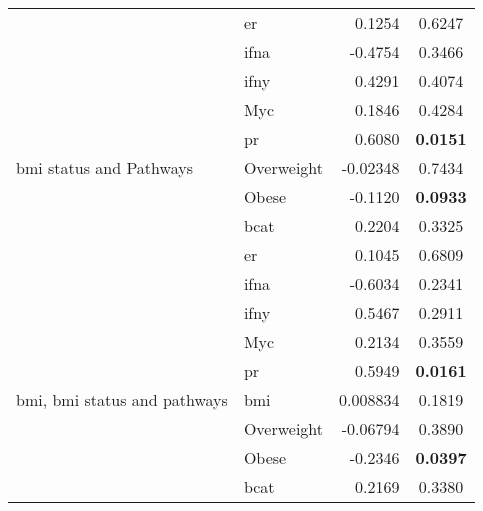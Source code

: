 \begin{table}[htpb]
\begin{threeparttable}
\begin{tabular}{llrc}
                                                                           & \gls{er}   & 0.1254    & 0.6247 \\
                                                                           & \gls{ifna} & -0.4754   & 0.3466 \\
                                                                           & \gls{ifny} & 0.4291    & 0.4074 \\
                                                                           & Myc        & 0.1846    & 0.4284 \\
                                                                           & \gls{pr}   & 0.6080    & \bfseries 0.0151  \\
				\hline
				\rule{0pt}{2.25ex}\gls{bmi} status and Pathways            & Overweight & -0.02348  & 0.7434 \\
                                                                           & Obese      & -0.1120   & \bfseries 0.0933  \\
                                                                           & \gls{bcat} & 0.2204    & 0.3325 \\
                                                                           & \gls{er}   & 0.1045    & 0.6809 \\
                                                                           & \gls{ifna} & -0.6034   & 0.2341 \\
                                                                           & \gls{ifny} & 0.5467    & 0.2911 \\
                                                                           & Myc        & 0.2134    & 0.3559 \\
                                                                           & \gls{pr}   & 0.5949    & \bfseries 0.0161  \\
				\hline
				\rule{0pt}{2.25ex}\gls{bmi}, \gls{bmi} status and pathways & \gls{bmi}  & 0.008834  & 0.1819 \\
                                                                           & Overweight & -0.06794  & 0.3890 \\
                                                                           & Obese      & -0.2346   & \bfseries 0.0397  \\
                                                                           & \gls{bcat} & 0.2169    & 0.3380 \\

\end{tabular}
\end{threeparttable}
\end{table}
